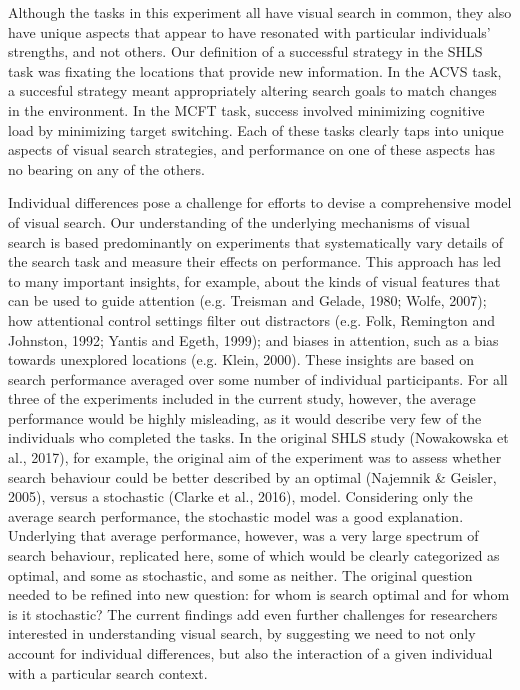 \documentclass[]{rsos}%
\begin{document}
Although the tasks in this experiment all have visual search in common, they also have unique aspects that appear to have resonated with particular individuals' strengths, and not others. Our definition of a successful strategy in the SHLS task was fixating the locations that provide new information. In the ACVS task, a succesful strategy meant appropriately altering search goals to match changes in the environment. In the MCFT task, success involved minimizing cognitive load by minimizing target switching. Each of these tasks clearly taps into unique aspects of visual search strategies, and performance on one of these aspects has no bearing on any of the others. 

Individual differences pose a challenge for efforts to devise a comprehensive model of visual search. Our understanding of the underlying mechanisms of visual search is based predominantly on experiments that systematically vary details of the search task and measure their effects on performance. This approach has led to many important insights, for example, about the kinds of visual features that can be used to guide attention (e.g. Treisman and Gelade, 1980; Wolfe, 2007); how attentional control settings filter out distractors (e.g. Folk, Remington and Johnston, 1992; Yantis and Egeth, 1999); and  biases in attention, such as a bias towards unexplored locations (e.g. Klein, 2000). These insights are based on search performance averaged over some number of individual participants. For all three of the experiments included in the current study, however, the average performance would be highly misleading, as it would describe very few of the individuals who completed the tasks. In the original SHLS study (Nowakowska et al., 2017), for example, the original aim of the experiment was to assess whether search behaviour could be better described by an optimal (Najemnik & Geisler, 2005), versus a stochastic (Clarke et al., 2016), model. Considering only the average search performance, the stochastic model was a good explanation. Underlying that average performance, however, was a very large spectrum of search behaviour, replicated here, some of which would be clearly categorized as optimal, and some as stochastic, and some as neither. The original question needed to be refined into new question: for whom is search optimal and for whom is it stochastic? The current findings add even further challenges for researchers interested in understanding visual search, by suggesting we need to not only account for individual differences, but also the interaction of a given individual with a particular search context.
\end{document}
